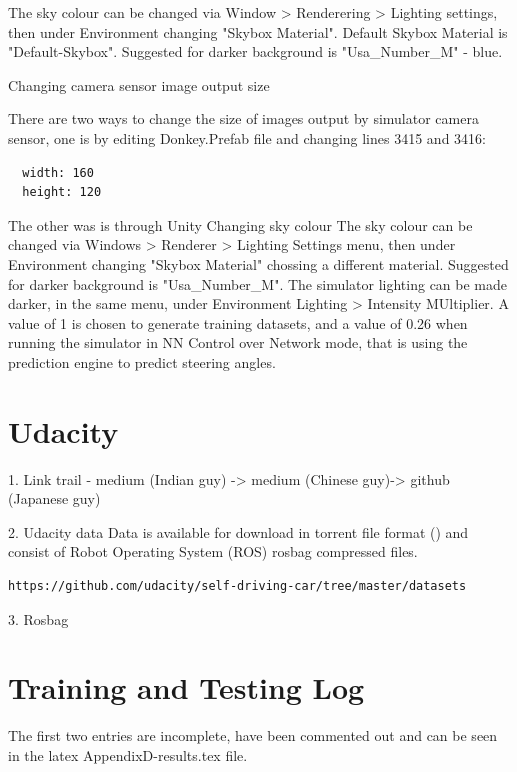 The sky colour can be changed via Window > Renderering > Lighting settings, then under Environment changing "Skybox Material". Default Skybox Material is "Default-Skybox". Suggested for darker background is "Usa\_Number\_M" - blue.

Changing camera sensor image output size

There are two ways to change the size of images output by simulator camera sensor, one is by editing Donkey.Prefab file and changing lines 3415 and 3416:
\begin{verbatim}
  width: 160
  height: 120
\end{verbatim}
The other was is through Unity
Changing sky colour
The sky colour can be changed via Windows > Renderer > Lighting Settings menu, then under Environment changing "Skybox Material" chossing a different material.  Suggested for darker background is "Usa\_Number\_M".
The simulator lighting can be made darker, in the same menu, under Environment Lighting > Intensity MUltiplier. A value of 1 is chosen to generate training datasets, and a value of 0.26 when running the simulator in NN Control over Network mode, that is using the prediction engine to predict steering angles.
\section{Udacity}

1. Link trail - medium (Indian guy) -> medium (Chinese guy)-> github (Japanese guy)  
  
2. Udacity data  
Data is available for download in torrent file format (\cite{torrentCite}) and consist of Robot Operating System (ROS) rosbag compressed files.

\begin{verbatim}
https://github.com/udacity/self-driving-car/tree/master/datasets
\end{verbatim}
3. Rosbag


\section{Training and Testing Log}
\label{res:training_and_testing_log}
The first two entries are incomplete, have been commented out and can be seen in the latex AppendixD-results.tex file.

